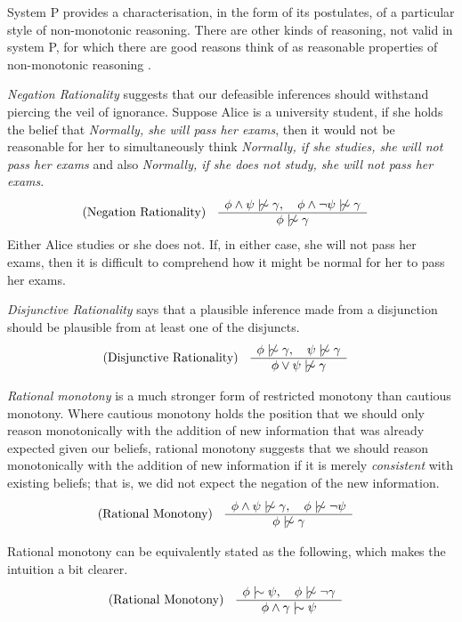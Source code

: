 System P provides a characterisation, in the form of its postulates, of a particular style of non-monotonic reasoning. There
are other kinds of reasoning, not valid in system P, for which there are good reasons think of as reasonable properties of
non-monotonic reasoning \cite{kraus1990nonmonotonic,lehmann1992what}.

\textit{Negation Rationality} suggests that our defeasible inferences should withstand piercing the veil of ignorance. Suppose
Alice is a university student, if she holds the belief that \textit{Normally, she will pass her exams}, then it would
not be reasonable for her to simultaneously think \textit{Normally, if she studies, she will not pass her exams} and also
\textit{Normally, if she does not study, she will not pass her exams}.
%
\begin{align}
	\inferLeft{Negation Rationality}{\phi \land \psi \ntwiddle \gamma, \quad \phi \land \neg \psi \ntwiddle \gamma}{\phi \ntwiddle \gamma}
\end{align}
Either Alice studies or she does not. If, in either case, she will not pass her exams, then it is difficult to comprehend
how it might be normal for her to pass her exams.

\textit{Disjunctive Rationality} says that a plausible inference made from a disjunction should be plausible from at
least one of the disjuncts.
\begin{align}
	\inferLeft{Disjunctive Rationality}{\phi \ntwiddle \gamma, \quad \psi \ntwiddle \gamma}{\phi \lor \psi \ntwiddle \gamma}
\end{align}

\textit{Rational monotony} is a much stronger form of restricted monotony than cautious monotony. Where cautious
monotony holds the position that we should only reason monotonically with the addition of new information that was
already expected given our beliefs, rational monotony suggests that we should reason monotonically with the addition of new
information if it is merely \textit{consistent} with existing beliefs; that is, we did not expect the negation of the
new information.
\begin{align}
	\inferLeft{Rational Monotony}{\phi \land \psi \ntwiddle \gamma, \quad \phi \ntwiddle \neg \psi }{\phi \ntwiddle \gamma}
\end{align}

Rational monotony can be equivalently stated as the following, which makes the intuition a bit clearer.
\begin{align}
	\inferLeft{Rational Monotony}{\phi \twiddle \psi, \quad \phi \ntwiddle \neg \gamma}{\phi \land \gamma \twiddle \psi}
\end{align}

